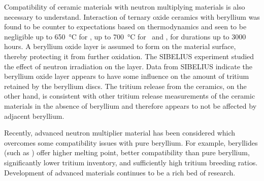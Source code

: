 \documentclass[11pt]{report} %
\newcommand{\lis}{\ce{Li4SiO4}}
\newcommand{\liz}{\ce{Li2ZrO3}}
\newcommand{\lial}{\ce{LiAlO2}}
\begin{document}
Compatibility of ceramic materials with neutron multiplying materials is also necessary to understand. Interaction of ternary oxide ceramics with beryllium was found to be counter to expectations based on thermodynamics and seen to be negligible up to \SI{650}{\celsius} for \lis, up to \SI{700}{\celsius} for \lial~and \liz, for durations up to 3000 hours. A beryllium oxide layer is assumed to form on the material surface, thereby protecting it from further oxidation. The SIBELIUS experiment studied the effect of neutron irradiation on the  layer. Data from SIBELIUS indicate the beryllium oxide layer appears to have some influence on the amount of tritium retained by the beryllium discs. The tritium release from the ceramics, on the other hand, is consistent with other tritium release measurements of the ceramic materials in the absence of beryllium and therefore appears to not be affected by adjacent beryllium.\cite{Kopasz1995,Roux1992} 

Recently, advanced neutron multiplier material has been considered which overcomes some compatibility issues with pure beryllium. For example, beryllides (such as ) offer higher melting point, better compatibility than pure beryllium, significantly lower tritium inventory, and sufficiently high tritium breeding ratios.\cite{Kawamura2003a} Development of advanced materials continues to be a rich bed of research.
\end{document}

